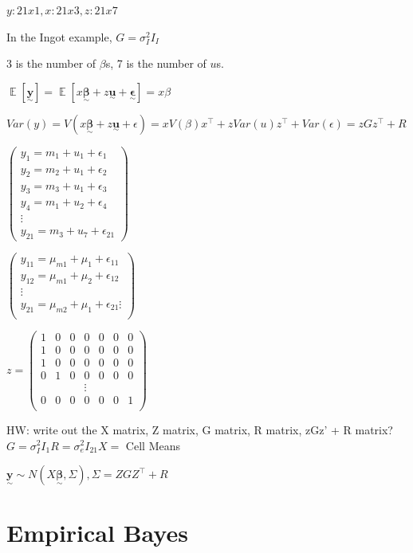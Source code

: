 \documentclass{article}
\newcommand{\svec}[1]{\underset{\sim}{\bm{#1}}} %
\DeclareMathOperator{\EX}{\mathbb{E}} %
\begin{document}
$y: 21x1, x: 21x3, z: 21x7$

In the Ingot example, $G = \sigma^2_I I_I$

3 is the number of $\beta$s, 7 is the number of $u$s. 

$\EX[\svec{y}] = \EX[x\svec{\beta} + z\svec{u} + \svec{\epsilon}] = x\beta$

$Var(y) = V(x\svec{\beta} + z\svec{u} + \epsilon) = xV(\beta)x^{\top} + zVar(u)z^{\top} + Var(\epsilon) = zGz^{\top} + R$

$\begin{pmatrix}
    y_1 = m_1 + u_1 + \epsilon_1 \\
    y_2 = m_2 + u_1 + \epsilon_2 \\
    y_3 = m_3 + u_1 + \epsilon_3 \\
    y_4 = m_1 + u_2 + \epsilon_4 \\
    \vdots \\
    y_{21} = m_3 + u_7 + \epsilon_{21}
\end{pmatrix}$

$\begin{pmatrix}
    y_{11} = \mu_{m1} + \mu_1 + \epsilon_{11} \\
    y_{12} = \mu_{m1} +\mu_2 + \epsilon_{12} \\
    \vdots \\
    y_{21} = \mu_{m2} + \mu_1 + \epsilon_{21}
    \vdots \\
\end{pmatrix}$

$z = \begin{pmatrix}
    1 & 0 & 0 & 0 & 0 & 0 & 0 \\
    1 & 0 & 0 & 0 & 0 & 0 & 0 \\
    1 & 0 & 0 & 0 & 0 & 0 & 0 \\
    0 & 1 & 0 & 0 & 0 & 0 & 0 \\
    &&&\vdots&&& \\
    0 & 0 & 0 & 0 & 0 & 0 & 1 \\
\end{pmatrix}$

HW: write out the X matrix, Z matrix, G matrix, R matrix, zGz' + R matrix?
$G = \sigma^2_I I_1
R = \sigma^2_e I_{21}
X =$ Cell Means

$\svec{y} \sim N(X\svec{\beta}, \Sigma), \Sigma = ZGZ^{\top} + R$

\section{Empirical Bayes}
\end{document}
